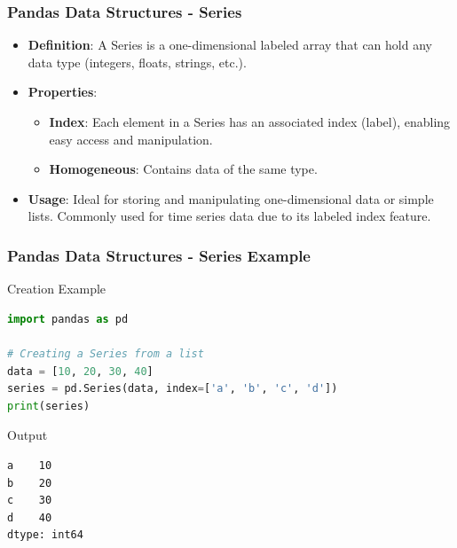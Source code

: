 \documentclass{beamer}
\begin{document}
\begin{frame}[fragile]
    \frametitle{Pandas Data Structures - Series}
    \begin{itemize}
        \item \textbf{Definition}: A Series is a one-dimensional labeled array that can hold any data type (integers, floats, strings, etc.).
        
        \item \textbf{Properties}:
        \begin{itemize}
            \item \textbf{Index}: Each element in a Series has an associated index (label), enabling easy access and manipulation.
            \item \textbf{Homogeneous}: Contains data of the same type.
        \end{itemize}
        
        \item \textbf{Usage}: Ideal for storing and manipulating one-dimensional data or simple lists. Commonly used for time series data due to its labeled index feature.
    \end{itemize}
\end{frame}

\begin{frame}[fragile]
    \frametitle{Pandas Data Structures - Series Example}
    \begin{block}{Creation Example}
        \begin{lstlisting}[language=Python]
import pandas as pd

# Creating a Series from a list
data = [10, 20, 30, 40]
series = pd.Series(data, index=['a', 'b', 'c', 'd'])
print(series)
        \end{lstlisting}
    \end{block}
    
    \begin{block}{Output}
        \begin{verbatim}
a    10
b    20
c    30
d    40
dtype: int64
        \end{verbatim}
    \end{block}
\end{frame}
\end{document}
